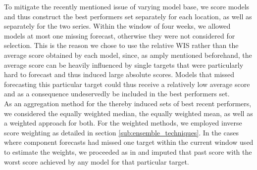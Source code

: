 To mitigate the recently mentioned issue of varying model base, we score models and thus construct the best performers set separately for each location, as well as separately for the two series. Within the window of four weeks, we allowed models at most one missing forecast, otherwise they were not considered for selection. This is the reason we chose to use the relative WIS rather than the average score obtained by each model, since, as amply mentioned beforehand, the average score can be heavily influenced by single targets that were particularly hard to forecast and thus induced large absolute scores. Models that missed forecasting this particular target could thus receive a relatively low average score and as a consequence undeservedly be included in the best performers set.\\
As an aggregation method for the thereby induced sets of best recent performers, we considered the equally weighted median, the equally weighted mean, as well as a weighted approach for both. For the weighted methods, we employed inverse score weighting as detailed in section \ref{sub:ensemble_techniques}. In the cases where component forecasts had missed one target within the current window used to estimate the weights, we proceeded as in \cite{bracher_evaluating_2021} and imputed that past score with the worst score achieved by any model for that particular target.\\

